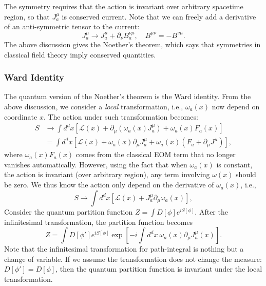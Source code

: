 \documentclass[aps,prb,superscriptaddress,nofootinbib]{revtex4}
\begin{document}
The symmetry requires that the action is invariant over arbitrary spacetime region, so that $J_a^\mu$ is conserved current.
Note that we can freely add a derivative of an anti-symmetric tensor to the current:
\begin{equation}
	J^\mu_a \rightarrow J^\mu_a + \partial_\nu B^{\nu\mu}_a,\quad
	B^{\mu\nu} = -B^{\nu\mu}.
\end{equation}
The above discussion gives the Noether's theorem, which says that symmetries in classical field theory imply conserved quantities.

\subsubsection{Ward Identity}
The quantum version of the Noether's theorem is the Ward identity.
From the above discussion, we consider a \textit{local} transformation, i.e., $\omega_a(x)$ now depend on coordinate $x$.
The action under such transformation becomes:
\begin{equation}
\begin{aligned}
	S &\rightarrow \int d^d x \left[\mathcal L(x) + \partial_\mu\left( \omega_a(x) J_a^\mu \right) + \omega_a(x) F_a(x)\right] \\
	&= \int d^d x \left[\mathcal L(x) + \omega_a(x) \partial_\mu J_a^\mu + \omega_a(x) (F_a+\partial_\mu J^\mu)\right],
\end{aligned}
\end{equation}
where $\omega_a(x) F_a(x)$ comes from the classical EOM term that no longer vanishes automatically.
However, using the fact that when $\omega_a(x)$ is constant, the action is invariant (over arbitrary region), any term involving $\omega(x)$ should be zero. 
We thus know the action only depend on the derivative of $\omega_a(x)$, i.e.,
\begin{equation}
	S \rightarrow \int d^d x \left[\mathcal L(x) + J_a^\mu \partial_\mu \omega_a(x)  \right],
\end{equation}
Consider the quantum partition function $Z = \int D[\phi] e^{iS[\phi]}$.
After the infinitesimal transformation, the partition function becomes
\begin{equation}
	Z = \int D[\phi'] e^{iS[\phi]} \exp\left[-i\int d^d x \ \omega_a(x) \partial_\mu J_a^\mu (x)\right].
\end{equation}
Note that the infinitesimal transformation for path-integral is nothing but a change of variable.
If we assume the transformation does not change the measure: $D[\phi'] = D[\phi]$, then the quantum partition function is invariant under the local transformation.
\end{document}
